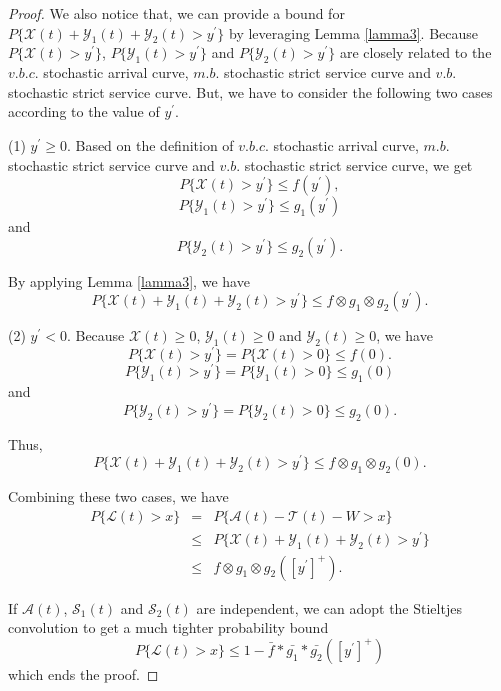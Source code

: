 \documentclass[12pt]{article}
\newtheorem{proof}{Proof}
\begin{document}
\begin{proof}
We also notice that, we can provide a bound for $P\{\mathcal{X}(t)+\mathcal{Y}_1(t)+\mathcal{Y}_2(t)>y^\prime\}$ by leveraging Lemma \ref{lamma3}. Because $P\{\mathcal{X}(t)>y^\prime\}$, $P\{\mathcal{Y}_1(t)>y^\prime\}$ and $P\{\mathcal{Y}_2(t)>y^\prime\}$ are closely related to the $v.b.c.$ stochastic arrival curve, $m.b.$ stochastic strict service curve and $v.b.$ stochastic strict service curve. But, we have to consider the following two cases according to the value of $y^\prime$.

(1) $y^\prime\geq 0$. Based on the definition of $v.b.c.$ stochastic arrival curve, $m.b.$ stochastic strict service curve and $v.b.$ stochastic strict service curve, we get
$$P\{\mathcal{X}(t)>y^\prime\}\leq f(y^\prime),$$
$$P\{\mathcal{Y}_1(t)>y^\prime\}\leq g_1(y^\prime)$$
and
$$P\{\mathcal{Y}_2(t)>y^\prime\}\leq g_2(y^\prime).$$

By applying Lemma \ref{lamma3}, we have
\begin{equation}\label{equation1}
P\{\mathcal{X}(t)+\mathcal{Y}_1(t)+\mathcal{Y}_2(t)>y^\prime\}\leq f\otimes g_1\otimes g_2(y^\prime).
\end{equation}

(2) $y^\prime<0$. Because $\mathcal{X}(t)\geq 0$, $\mathcal{Y}_1(t)\geq 0$ and $\mathcal{Y}_2(t)\geq 0$, we have
$$P\{\mathcal{X}(t)>y^\prime\}=P\{\mathcal{X}(t)>0\}\leq f(0).$$
$$P\{\mathcal{Y}_1(t)>y^\prime\}=P\{\mathcal{Y}_1(t)>0\}\leq g_1(0)$$
and
$$P\{\mathcal{Y}_2(t)>y^\prime\}=P\{\mathcal{Y}_2(t)>0\}\leq g_2(0).$$

Thus,
\begin{equation}\label{equation2}
P\{\mathcal{X}(t)+\mathcal{Y}_1(t)+\mathcal{Y}_2(t)>y^\prime\}\leq f\otimes g_1\otimes g_2(0).
\end{equation}

Combining these two cases, we have
\begin{eqnarray*}
  P\{\mathcal{L}(t)>x\}&=&P\{\mathcal{A}(t)-\mathcal{T}(t)-W>x\}\\
  &\leq&P\{\mathcal{X}(t)+\mathcal{Y}_1(t)+\mathcal{Y}_2(t)>y^\prime\}\\
  &\leq& f\otimes g_1\otimes g_2([y^\prime]^+).
\end{eqnarray*}

If $\mathcal{A}(t)$, $\mathcal{S}_1(t)$ and $\mathcal{S}_2(t)$ are independent, we can adopt the Stieltjes convolution to get a much tighter probability bound
$$P\{\mathcal{L}(t)>x\}\leq 1-\bar{f}\ast\bar{g_1}\ast\bar{g_2}([y^\prime]^+)$$
which ends the proof.
\end{proof}
\end{document}
